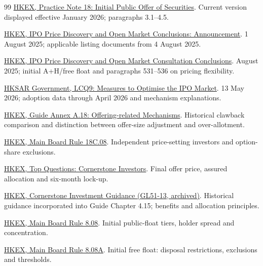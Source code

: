 \documentclass[11pt,a4paper]{article}
\begin{document}
\begin{thebibliography}{99}
 \href{https://hkexen.thomsonreuters.com/rulebook/initial-public-offer-securities}{HKEX, Practice Note 18: Initial Public Offer of Securities}. Current version displayed effective January 2026; paragraphs 3.1--4.5.

 \href{https://www.hkex.com.hk/News/Regulatory-Announcements/2025/2508012news?sc_lang=en}{HKEX, IPO Price Discovery and Open Market Conclusions: Announcement}. 1 August 2025; applicable listing documents from 4 August 2025.

 \href{https://www.hkex.com.hk/-/media/HKEX-Market/News/Market-Consultations/2016-Present/December-2024-Optimise-IPO-Price/Conclusions-Aug-2025/cp202412cc.pdf}{HKEX, IPO Price Discovery and Open Market Consultation Conclusions}. August 2025; initial A+H/free float and paragraphs 531--536 on pricing flexibility.

 \href{https://www.info.gov.hk/gia/general/202605/13/P2026051200604p.htm}{HKSAR Government, LCQ9: Measures to Optimise the IPO Market}. 13 May 2026; adoption data through April 2026 and mechanism explanations.

 \href{https://en-rules.hkex.com.hk/sites/default/files/net_file_store/A.18_Offering-related_Mechansims.pdf}{HKEX, Guide Annex A.18: Offering-related Mechanisms}. Historical clawback comparison and distinction between offer-size adjustment and over-allotment.

 \href{https://en-rules.hkex.com.hk/rulebook/18c08}{HKEX, Main Board Rule 18C.08}. Independent price-setting investors and option-share exclusions.

 \href{https://www.hkex.com.hk/Global/Exchange/FAQ/Top-Questions?sc_lang=en}{HKEX, Top Questions: Cornerstone Investors}. Final offer price, assured allocation and six-month lock-up.

 \href{https://www.hkex.com.hk/-/media/HKEX-Market/Listing/Rules-and-Guidance/Archive/Guidance-Letters/GL51_13.pdf}{HKEX, Cornerstone Investment Guidance (GL51-13, archived)}. Historical guidance incorporated into Guide Chapter 4.15; benefits and allocation principles.

 \href{https://en-rules.hkex.com.hk/rulebook/808}{HKEX, Main Board Rule 8.08}. Initial public-float tiers, holder spread and concentration.

 \href{https://en-rules.hkex.com.hk/rulebook/808a}{HKEX, Main Board Rule 8.08A}. Initial free float: disposal restrictions, exclusions and thresholds.


\end{thebibliography}
\end{document}
